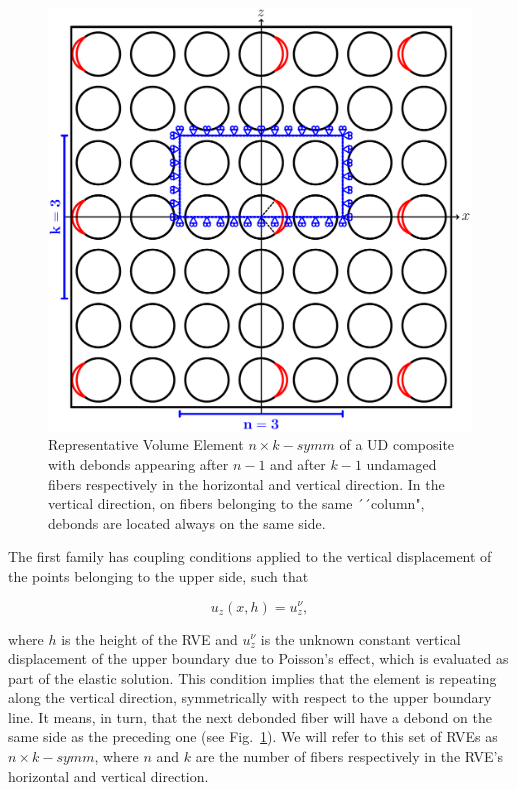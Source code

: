\begin{figure}[!htb]
\centering
  \includegraphics[width=\textwidth]{paperD/coupling.pdf}
\caption{Representative Volume Element $n \times k-symm$ of a UD composite with debonds appearing after $n-1$ and after $k-1$ undamaged fibers respectively in the horizontal and vertical direction. In the vertical direction, on fibers belonging to the same ´´column", debonds are located always on the same side.}\label{paperD:fig:coupling-rve}
\end{figure}

The first family has coupling conditions applied to the vertical displacement of the points belonging to the upper side, such that

\begin{equation}
u_{z}\left(x,h\right)=u_{z}^{\nu},
\end{equation}

where $h$ is the height of the RVE and $u_{z}^{\nu}$ is the unknown constant vertical displacement of the upper boundary due to Poisson's effect, which is evaluated as part of the elastic solution. This condition implies that the element is repeating along the vertical direction, symmetrically with respect to the upper boundary line. It means, in turn, that the next debonded fiber will have a debond on the same side as the preceding one (see Fig.~\ref{paperD:fig:coupling-rve}). We will refer to this set of RVEs as $n \times k-symm$, where $n$ and $k$ are the number of fibers respectively in the RVE's horizontal and vertical direction.


